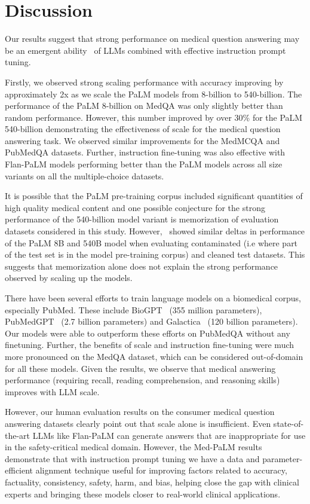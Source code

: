 \section{Discussion}
\label{sec:discussion}
Our results suggest that strong performance on medical question answering may be an emergent ability~\citep{wei2022emergent} of LLMs combined with effective instruction prompt tuning.

Firstly, we observed strong scaling performance with accuracy improving by approximately 2x as we scale the PaLM models from 8-billion to 540-billion. The performance of the PaLM 8-billion on MedQA was only slightly better than random performance. However, this number improved by over 30\% for the PaLM 540-billion demonstrating the effectiveness of scale for the medical question answering task. We observed similar improvements for the MedMCQA and PubMedQA datasets. Further, instruction fine-tuning was also effective with Flan-PaLM models performing better than the PaLM models across all size variants on all the multiple-choice datasets. 

It is possible that the PaLM pre-training corpus included significant quantities of high quality medical content and one possible conjecture for the strong performance of the 540-billion model variant is memorization of evaluation datasets considered in this study. However,~\citet{chowdhery2022palm} showed similar deltas in performance of the PaLM 8B and 540B model when evaluating contaminated (i.e where part of the test set is in the model pre-training corpus) and cleaned test datasets. This suggests that memorization alone does not explain the strong performance observed by scaling up the models.

There have been several efforts to train language models on a biomedical corpus, especially PubMed. These include BioGPT~\cite{luo2022biogpt} (355 million parameters), PubMedGPT~\cite{bolton2022pubmedgpt} (2.7 billion parameters) and Galactica~\cite{taylor2022galactica} (120 billion parameters). Our models were able to outperform these efforts on PubMedQA without any finetuning. Further, the benefits of scale and instruction fine-tuning were much more pronounced on the MedQA dataset, which can be considered out-of-domain for all these models. Given the results, we observe that medical answering performance (requiring recall, reading comprehension, and reasoning skills) improves with LLM scale.

However, our human evaluation results on the consumer medical question answering datasets clearly point out that scale alone is insufficient. Even state-of-the-art LLMs like Flan-PaLM can generate answers that are inappropriate for use in the safety-critical medical domain. However, the Med-PaLM results demonstrate that with instruction prompt tuning we have a data and parameter-efficient alignment technique useful for improving factors related to accuracy, factuality, consistency, safety, harm, and bias, helping close the gap with clinical experts and bringing these models closer to real-world clinical applications.


